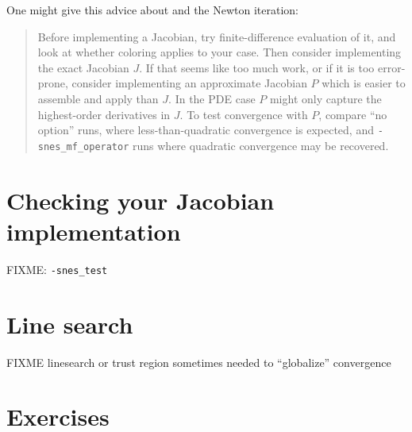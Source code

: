 One might give this advice about \pSNES and the Newton iteration:
\begin{quote}
Before implementing a Jacobian, try finite-difference evaluation of it, and look at whether coloring applies to your case.  Then consider implementing the exact Jacobian $J$.  If that seems like too much work, or if it is too error-prone, consider implementing an approximate Jacobian $P$ which is easier to assemble and apply than $J$.  In the PDE case $P$ might only capture the highest-order derivatives in $J$.  To test convergence with $P$, compare ``no option'' runs, where less-than-quadratic convergence is expected, and \texttt{-snes\_mf\_operator} runs where quadratic convergence may be recovered.
\end{quote}


\section{Checking your Jacobian implementation}

FIXME: \texttt{-snes\_test}


\section{Line search} \label{sec:linesearch}

FIXME linesearch or trust region sometimes needed to ``globalize'' convergence \citep{Kelley2003}


\section{Exercises}

